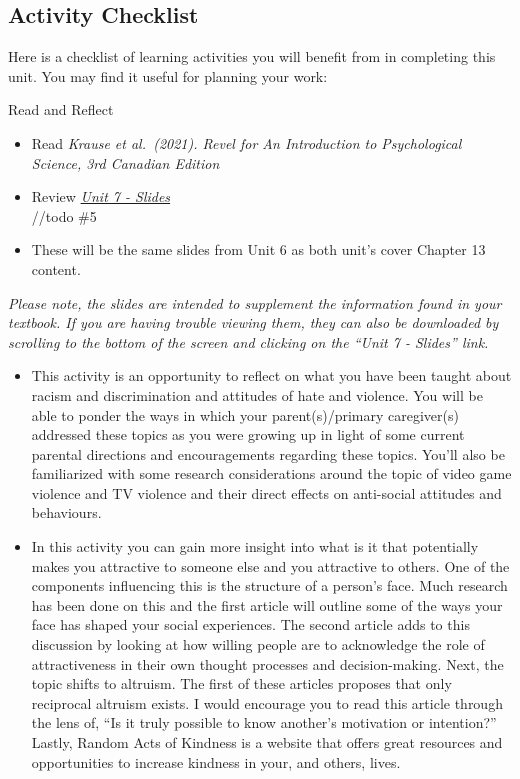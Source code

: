 \documentclass[
]{book}
\providecommand{\tightlist}{%
  \setlength{\itemsep}{0pt}\setlength{\parskip}{0pt}}
\begin{document}
\hypertarget{activity-checklist-5}{%
\subsection*{Activity Checklist}\label{activity-checklist-5}}

Here is a checklist of learning activities you will benefit from in completing this unit. You may find it useful for planning your work:

\begin{reflect}
{Read and Reflect}

\begin{itemize}
\tightlist
\item
  Read \emph{Krause et al.~(2021). Revel for An Introduction to Psychological Science, 3rd Canadian Edition}\\
\item
  Review \href{PSYC106-CH13SocialPsychology-3rdEd.pptx}{\emph{Unit 7 - Slides}}\\
  //todo \#5
\item
  These will be the same slides from Unit 6 as both unit's cover Chapter 13 content.
\end{itemize}

\emph{Please note, the slides are intended to supplement the information found in your textbook. If you are having trouble viewing them, they can also be downloaded by scrolling to the bottom of the screen and clicking on the ``Unit 7 - Slides'' link.}

\begin{itemize}
\item
  This activity is an opportunity to reflect on what you have been taught about racism and discrimination and attitudes of hate and violence. You will be able to ponder the ways in which your parent(s)/primary caregiver(s) addressed these topics as you were growing up in light of some current parental directions and encouragements regarding these topics. You'll also be familiarized with some research considerations around the topic of video game violence and TV violence and their direct effects on anti-social attitudes and behaviours.
\item
  In this activity you can gain more insight into what is it that potentially makes you attractive to someone else and you attractive to others. One of the components influencing this is the structure of a person's face. Much research has been done on this and the first article will outline some of the ways your face has shaped your social experiences. The second article adds to this discussion by looking at how willing people are to acknowledge the role of attractiveness in their own thought processes and decision-making. Next, the topic shifts to altruism. The first of these articles proposes that only reciprocal altruism exists. I would encourage you to read this article through the lens of, ``Is it truly possible to know another's motivation or intention?'' Lastly, Random Acts of Kindness is a website that offers great resources and opportunities to increase kindness in your, and others, lives.
\end{itemize}


\end{reflect}
\end{document}
